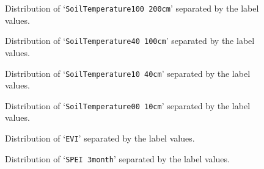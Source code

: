 \documentclass[10pt,parskip=half,
toc=sectionentrywithdots,
bibliography=totocnumbered,
captions=tableheading,numbers=noendperiod]{scrartcl}
\begin{document}
\begin{figure}[H]\begin{center}\end{center}\caption{Distribution of `\texttt{SoilTemperature100\ 200cm}' separated by the
label values.}\label{fig_dist7}\end{figure}

\begin{figure}[H]\begin{center}\end{center}\caption{Distribution of `\texttt{SoilTemperature40\ 100cm}' separated by the
label values.}\label{fig_dist8}\end{figure}

\begin{figure}[H]\begin{center}\end{center}\caption{Distribution of `\texttt{SoilTemperature10\ 40cm}' separated by the
label values.}\label{fig_dist9}\end{figure}

\begin{figure}[H]\begin{center}\end{center}\caption{Distribution of `\texttt{SoilTemperature00\ 10cm}' separated by the
label values.}\label{fig_dist10}\end{figure}

\begin{figure}[H]\begin{center}\end{center}\caption{Distribution of `\texttt{EVI}' separated by the label values.}\label{fig_dist11}\end{figure}

\begin{figure}[H]\begin{center}\end{center}\caption{Distribution of `\texttt{SPEI\ 3month}' separated by the label values.}\label{fig_dist12}\end{figure}
\end{document}
